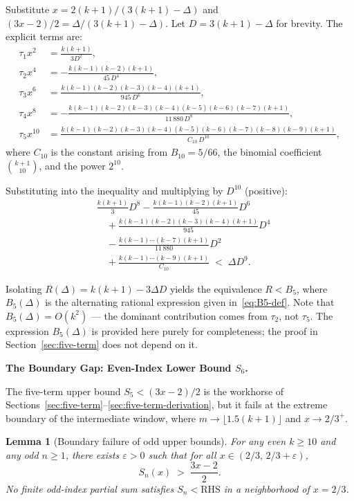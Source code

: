 \documentclass[12pt,a4paper]{article}
\theoremstyle{plain}
\newtheorem{lemma}[theorem]{Lemma}
\theoremstyle{definition}
\begin{document}
Substitute $x = 2(k+1)/(3(k+1)-\Delta)$ and
$(3x-2)/2 = \Delta/(3(k+1)-\Delta)$.
Let $D = 3(k+1)-\Delta$ for brevity.  The explicit terms are:
\begin{align*}
  \tau_1 x^2 &= \frac{k(k+1)}{3D^2}, \\[4pt]
  \tau_2 x^4 &= -\frac{k(k-1)(k-2)(k+1)}{45\,D^4}, \\[4pt]
  \tau_3 x^6 &= \frac{k(k-1)(k-2)(k-3)(k-4)(k+1)}{945\,D^6}, \\[4pt]
  \tau_4 x^8 &=
    -\frac{k(k-1)(k-2)(k-3)(k-4)(k-5)(k-6)(k-7)(k+1)}
           {11\,880\,D^8}, \\[4pt]
  \tau_5 x^{10} &=
    \frac{k(k-1)(k-2)(k-3)(k-4)(k-5)(k-6)(k-7)(k-8)(k-9)(k+1)}
         {C_{10}\,D^{10}},
\end{align*}
where $C_{10}$ is the constant arising from $B_{10}=5/66$, the
binomial coefficient $\binom{k+1}{10}$, and the power $2^{10}$.

Substituting into the inequality and multiplying by $D^{10}$ (positive):
\begin{align*}
  &\frac{k(k+1)}{3}D^8
   - \frac{k(k-1)(k-2)(k+1)}{45}D^6 \\
  &\quad + \frac{k(k-1)(k-2)(k-3)(k-4)(k+1)}{945}D^4 \\
  &\quad - \frac{k(k-1)\cdots(k-7)(k+1)}{11\,880}D^2 \\
  &\quad + \frac{k(k-1)\cdots(k-9)(k+1)}{C_{10}}
   \; < \; \Delta D^9.
\end{align*}

Isolating $R(\Delta) = k(k+1) - 3\Delta D$ yields the equivalence
$R < B_5$, where $B_5(\Delta)$ is the alternating rational expression
given in~\eqref{eq:B5-def}.  Note that $B_5(\Delta) = O(k^2)$ ---
the dominant contribution comes from $\tau_2$, not $\tau_5$.
The expression $B_5(\Delta)$ is provided here purely for completeness;
the proof in Section~\ref{sec:five-term} does not depend on it.

\medskip
\noindent\textbf{The Boundary Gap: Even-Index Lower Bound $S_6$.}
\label{sec:boundary-gap}

The five-term upper bound $S_5 < (3x-2)/2$ is the workhorse of
Sections~\ref{sec:five-term}--\ref{sec:five-term-derivation}, but
it fails at the extreme boundary of the intermediate window, where
$m \to \lfloor 1.5(k+1)\rfloor$ and $x \to 2/3^+$.

\begin{lemma}[Boundary failure of odd upper bounds]\label{lem:boundary-failure}
  For any even $k \ge 10$ and any odd $n \ge 1$, there exists
  $\varepsilon > 0$ such that for all $x \in (2/3,\, 2/3+\varepsilon)$,
  \[
    S_n(x) \; > \; \frac{3x-2}{2}.
  \]
  No finite odd-index partial sum satisfies $S_n < \mathrm{RHS}$ in a
  neighborhood of $x = 2/3$.
\end{lemma}
\end{document}
